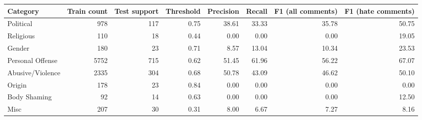 \begin{tabular}{lrrrrrrr}
\toprule
Category & Train count & Test support & Threshold & Precision & Recall & F1 (all comments) & F1 (hate comments) \\
\midrule
Political & 978 & 117 & 0.75 & 38.61 & 33.33 & 35.78 & 50.75 \\
Religious & 110 & 18 & 0.44 & 0.00 & 0.00 & 0.00 & 19.05 \\
Gender & 180 & 23 & 0.71 & 8.57 & 13.04 & 10.34 & 23.53 \\
Personal Offense & 5752 & 715 & 0.62 & 51.45 & 61.96 & 56.22 & 67.07 \\
Abusive/Violence & 2335 & 304 & 0.68 & 50.78 & 43.09 & 46.62 & 50.10 \\
Origin & 178 & 23 & 0.84 & 0.00 & 0.00 & 0.00 & 0.00 \\
Body Shaming & 92 & 14 & 0.63 & 0.00 & 0.00 & 0.00 & 12.50 \\
Misc & 207 & 30 & 0.31 & 8.00 & 6.67 & 7.27 & 8.16 \\
\bottomrule
\end{tabular}
